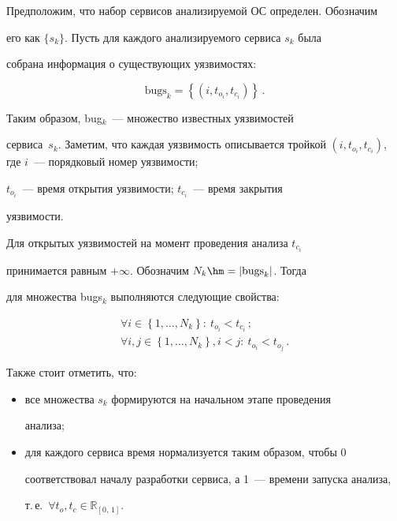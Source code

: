   


  Предположим, что набор сервисов анализируемой ОС определен. Обозначим 


его как $\{s_k\}$. Пусть для каждого анализируемого сервиса $s_k$ была 


собрана информация о существующих уязвимостях:


  $$


  \mathrm{bugs}_k=\left\{ \left( i,t_{o_i}, t_{c_i}\right)\right\}\,.


  $$


  


  Таким образом, bug$_k$~--- множество известных уязвимостей 


сервиса~$s_k$. Заметим, что каждая уязвимость описывается тройкой $\left( 


i,t_{o_i}, t_{c_i}\right)$, где $i$~--- порядковый номер уязвимости; 


  $ t_{o_i}$~--- время открытия уязвимости; $ t_{c_i}$~--- время закрытия 


уязвимости.


  


  Для открытых уязвимостей на момент проведения анализа $ t_{c_i}$ 


принимается равным $+\infty$. Обозначим $N_k\hm=\vert \mathrm{bugs}_k\vert$. Тогда 


для множества bugs$_k$ выполняются следующие свойства:


  \begin{gather*}


  \forall i \in \left\{ 1,\ldots , N_k\right\}: \ t_{o_i}<t_{c_ i}\,;\\


  \forall i, j \in \left\{1,\ldots , N_k\right\}, i<j:\  t_{o_i}<t_{o_ j}\,.


  \end{gather*}


  


  Также стоит отметить, что:


  \begin{itemize}


  \item все множества $s_k$ формируются на начальном этапе проведения 


анализа;


  \item для каждого сервиса время нормализуется таким образом, чтобы 0 


соответствовал началу разработки сервиса, а 1~--- времени запуска анализа, 


т.\,е.\ $\forall t_o, t_c\in \mathbb{R}_{[0,\,1]}$.


  \end{itemize}


